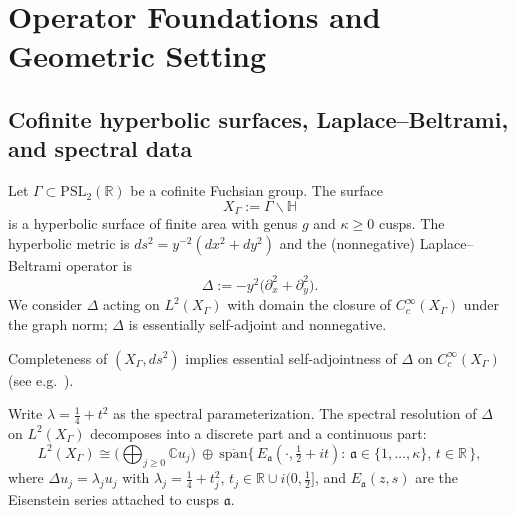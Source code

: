 
\section{Operator Foundations and Geometric Setting}
\label{sec:ch4-part1-operator-foundations} \relax \hspace{0pt}

\subsection{Cofinite hyperbolic surfaces, Laplace–Beltrami, and spectral data} %
\label{subsec:ch4-part1-geometry-spectral} \relax

\begin{definition} %
\label{def:cofinite-surface-laplacian}
Let $\Gamma\subset \mathrm{PSL}_2(\mathbb{R})$ be a cofinite Fuchsian group. The surface
\[
  X_\Gamma := \Gamma\backslash \mathbb{H}
\]
is a hyperbolic surface of finite area with genus $g$ and $\kappa\ge 0$ cusps. The hyperbolic metric is $ds^2 = y^{-2}(dx^2+dy^2)$ and the (nonnegative) Laplace–Beltrami operator is
\[
  \Delta := -y^2\big(\partial_x^2+\partial_y^2\big).
\]
We consider $\Delta$ acting on $L^2(X_\Gamma)$ with domain the closure of $C_c^\infty(X_\Gamma)$ under the graph norm; $\Delta$ is essentially self-adjoint and nonnegative.
\end{definition}

\begin{remark}
\label{rem:esa-cofinite}
Completeness of $(X_\Gamma,ds^2)$ implies essential self-adjointness of $\Delta$ on $C_c^\infty(X_\Gamma)$ (see e.g.\ \cite[Ch.~1]{LaxPhillips1976}). \relax
\end{remark}

\begin{definition} %
\label{def:spectral-parameter}
Write $\lambda = \frac{1}{4}+t^2$ as the spectral parameterization. The spectral resolution of $\Delta$ on $L^2(X_\Gamma)$ decomposes into a discrete part and a continuous part:
\[
  L^2(X_\Gamma) \cong \Big(\bigoplus_{j\ge 0}\mathbb{C}u_j\Big)\ \oplus\
  \overline{\mathrm{span}}\Big\{\,E_{\mathfrak a}(\cdot,\tfrac12+it):\, \mathfrak a\in\{1,\dots,\kappa\},\, t\in\mathbb{R}\,\Big\},
\]
where $\Delta u_j=\lambda_j u_j$ with $\lambda_j=\frac14+t_j^2$, $t_j\in \mathbb{R}\cup i(0,\tfrac12]$, and $E_{\mathfrak a}(z,s)$ are the Eisenstein series attached to cusps $\mathfrak a$. \relax
\end{definition}

